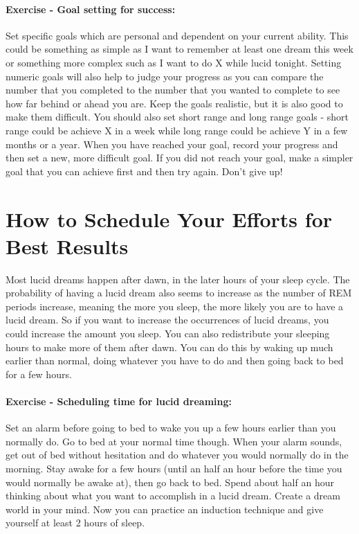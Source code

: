 \documentclass{book}
\begin{document}
\paragraph{Exercise - Goal setting for success:} Set specific goals which are personal and dependent on your current ability. This could be something as simple as I want to remember at least one dream this week or something more complex such as I want to do X while lucid tonight. Setting numeric goals will also help to judge your progress as you can compare the number that you completed to the number that you wanted to complete to see how far behind or ahead you are. Keep the goals realistic, but it is also good to make them difficult. You should also set short range and long range goals - short range could be achieve X in a week while long range could be achieve Y in a few months or a year. When you have reached your goal, record your progress and then set a new, more difficult goal. If you did not reach your goal, make a simpler goal that you can achieve first and then try again. Don't give up!

\section{How to Schedule Your Efforts for Best Results}
Most lucid dreams happen after dawn, in the later hours of your sleep cycle. The probability of having a lucid dream also seems to increase as the number of REM periods increase, meaning the more you sleep, the more likely you are to have a lucid dream. So if you want to increase the occurrences of lucid dreams, you could increase the amount you sleep. You can also redistribute your sleeping hours to make more of them after dawn. You can do this by waking up much earlier than normal, doing whatever you have to do and then going back to bed for a few hours.

\paragraph{Exercise - Scheduling time for lucid dreaming:} Set an alarm before going to bed to wake you up a few hours earlier than you normally do. Go to bed at your normal time though. When your alarm sounds, get out of bed without hesitation and do whatever you would normally do in the morning. Stay awake for a few hours (until an half an hour before the time you would normally be awake at), then go back to bed. Spend about half an hour thinking about what you want to accomplish in a lucid dream. Create a dream world in your mind. Now you can practice an induction technique and give yourself at least 2 hours of sleep.
\end{document}
